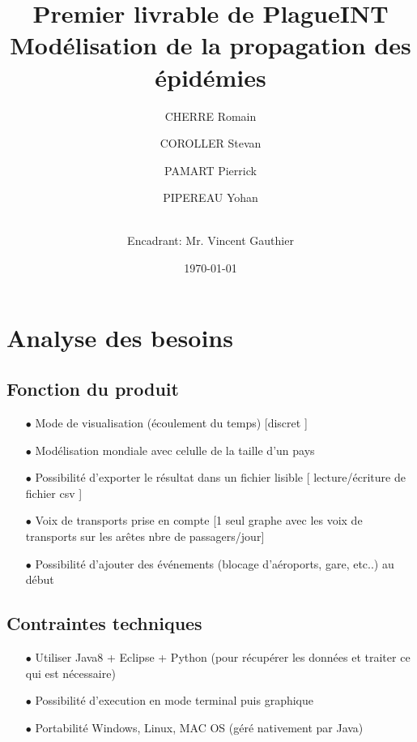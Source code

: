 \documentclass[12pt,a4paper]{report}
\title{ \Huge \textbf{Premier livrable de PlagueINT} \\ \large Modélisation de la propagation des épidémies}
\date{\today}
\author{
CHERRE Romain
\and COROLLER Stevan 
\and PAMART Pierrick
\and PIPEREAU Yohan
\and \\
Encadrant: Mr. Vincent Gauthier }
\begin{document}
\maketitle

\tableofcontents

\newpage

\section*{Analyse des besoins}

\subsection*{Fonction du produit}
\begin{flushleft}
  \begin{itemize}
	\item[$\bullet$] Mode de visualisation (écoulement du temps) [discret ]
	\item[$\bullet$] Modélisation mondiale avec celulle de la taille d'un pays
	\item[$\bullet$] Possibilité d'exporter le résultat dans un fichier lisible [ lecture/écriture de fichier csv ]
	\item[$\bullet$] Voix de transports prise en compte [1 seul graphe avec les voix de transports sur les arêtes nbre de passagers/jour]
	\item[$\bullet$] Possibilité d'ajouter des événements (blocage d'aéroports, gare, etc..) au début
  \end{itemize}
\end{flushleft}

\subsection*{Contraintes techniques}
\begin{flushleft}
  \begin{itemize}
	\item[$\bullet$] Utiliser Java8 + Eclipse + Python (pour récupérer les données et traiter ce qui est nécessaire)
	\item[$\bullet$] Possibilité d'execution en mode terminal puis graphique
	\item[$\bullet$] Portabilité Windows, Linux, MAC OS (géré nativement par Java)
    \end{itemize}
\end{flushleft}
\end{document}
